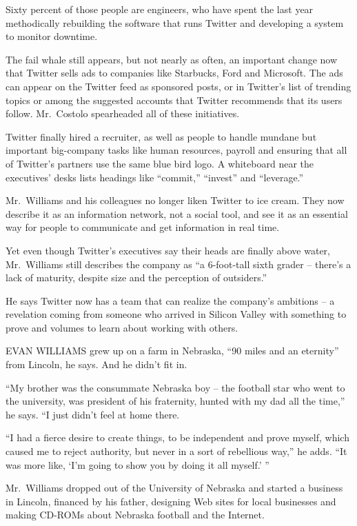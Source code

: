 ﻿\documentclass[12pt]{article}
\begin{document}
Sixty percent of those people are engineers, who have spent the last year methodically rebuilding
the software that runs Twitter and developing a system to monitor downtime.

The fail whale still appears, but not nearly as often, an important change now that Twitter sells
ads to companies like Starbucks, Ford and Microsoft. The ads can appear on the Twitter feed as
sponsored posts, or in Twitter's list of trending topics or among the suggested accounts that
Twitter recommends that its users follow. Mr.~Costolo spearheaded all of these initiatives.

Twitter finally hired a recruiter, as well as people to handle mundane but important big-company
tasks like human resources, payroll and ensuring that all of Twitter's partners use the same blue
bird logo. A whiteboard near the executives' desks lists headings like ``commit,'' ``invest'' and
``leverage.''

Mr.~Williams and his colleagues no longer liken Twitter to ice cream. They now describe it as an
information network, not a social tool, and see it as an essential way for people to communicate and
get information in real time.

Yet even though Twitter's executives say their heads are finally above water, Mr.~Williams still
describes the company as ``a 6-foot-tall sixth grader -- there's a lack of maturity, despite size
and the perception of outsiders.''

He says Twitter now has a team that can realize the company's ambitions -- a revelation coming from
someone who arrived in Silicon Valley with something to prove and volumes to learn about working
with others.

EVAN WILLIAMS grew up on a farm in Nebraska, ``90 miles and an eternity'' from Lincoln, he says. And
he didn't fit in.

``My brother was the consummate Nebraska boy -- the football star who went to the university, was
president of his fraternity, hunted with my dad all the time,'' he says. ``I just didn't feel at
home there.

``I had a fierce desire to create things, to be independent and prove myself, which caused me to
reject authority, but never in a sort of rebellious way,'' he adds. ``It was more like, `I'm going
to show you by doing it all myself.' ''

Mr.~Williams dropped out of the University of Nebraska and started a business in Lincoln, financed
by his father, designing Web sites for local businesses and making CD-ROMs about Nebraska football
and the Internet.
\end{document}
